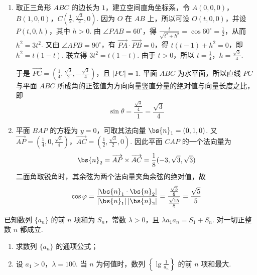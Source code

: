 \begin{solution}
\begin{enumerate}
\item 取正三角形 \(ABC\) 的边长为 \(1\)，建立空间直角坐标系，令 \(A(0,0,0)\)，\(B(1,0,0)\)，\(C\left(\frac12,\frac{\sqrt3}{2},0\right)\).
因为 \(O\) 在 \(AB\) 上，所以可设 \(O(t,0,0)\)，并设 \(P(t,0,h)\)，其中 \(h>0\). 由 \(\angle PAB=60^{\circ}\)，得 \(\frac{t}{\sqrt{t^2+h^2}}=\cos60^{\circ}=\frac12\)，从而 \(h^2=3t^2\).
又由 \(\angle APB=90^{\circ}\)，有 \(\overrightarrow{PA}\cdot\overrightarrow{PB}=0\)，得 \(t(t-1)+h^2=0\)，即 \(h^2=t(1-t)\). 联立得 \(3t^2=t(1-t)\). 由于 \(t>0\)，所以 \(t=\frac14\)，\(h=\frac{\sqrt3}{4}\).

于是 \(\overrightarrow{PC}=\left(\frac14,\frac{\sqrt3}{2},-\frac{\sqrt3}{4}\right)\)，且 \(|PC|=1\).
平面 \(ABC\) 为水平面，所以直线 \(PC\) 与平面 \(ABC\) 所成角的正弦值为方向向量竖直分量的绝对值与向量长度之比，即
\[
\sin\theta=\frac{\frac{\sqrt3}{4}}{1}=\frac{\sqrt3}{4}
\]
\item 平面 \(BAP\) 的方程为 \(y=0\)，可取其法向量 \(\bs{n}_1=(0,1,0)\). 又 \(\overrightarrow{AP}=\left(\frac14,0,\frac{\sqrt3}{4}\right)\)，\(\overrightarrow{AC}=\left(\frac12,\frac{\sqrt3}{2},0\right)\).
因此平面 \(CAP\) 的一个法向量为
\[
\bs{n}_2=\overrightarrow{AP}\times\overrightarrow{AC}
=\frac18(-3,\sqrt3,\sqrt3)
\]
二面角取锐角时，其余弦为两个法向量夹角余弦的绝对值，故
\[
\cos\varphi
=\frac{|\bs{n}_1\cdot\bs{n}_2|}{|\bs{n}_1|\,|\bs{n}_2|}
=\frac{\frac{\sqrt3}{8}}{\frac{\sqrt{15}}{8}}
=\frac{\sqrt5}{5}
\]
\end{enumerate}
\end{solution}

\begin{problem}
已知数列 \(\{a_{n}\}\) 的前 \(n\) 项和为 \(S_{n}\)，常数 \(\lambda > 0\)，且 \(\lambda a_{1}a_{n} = S_{1} + S_{n}\). 对一切正整数 \(n\) 都成立.
\begin{enumerate}
\item 求数列 \( \{a_{n}\} \) 的通项公式；
\item 设 \(a_{1} > 0\)，\(\lambda = 100\). 当 \(n\) 为何值时，数列 \(\left\{\lg \frac{1}{a_n}\right\}\) 的前 \(n\) 项和最大.
\end{enumerate}
\end{problem}

